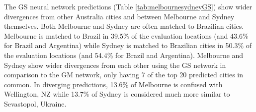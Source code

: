 \documentclass[10pt,letterpaper,hidelinks]{article}
\begin{document}
\begin{table}[!htbp]
\begin{adjustwidth}{-2.25in}{0in}
\begin{tabular}{ l l l l l}
\hline
\end{tabular}
\end{adjustwidth}
\end{table}

The GS neural network predictions (Table \ref{tab:melbournesydneyGS}) show wider divergences from other Australia cities and between Melbourne and Sydney themselves. Both Melbourne and Sydney are often matched to Brazilian cities. Melbourne is matched to Brazil in 39.5\% of the evaluation locations (and 43.6\% for Brazil and Argentina) while Sydney is matched to Brazilian cities in 50.3\% of the evaluation locations (and 54.4\% for Brazil and Argentina). Melbourne and Sydney show wider divergences from each other using the GS network in comparison to the GM network, only having 7 of the top 20 predicted cities in common. In diverging predictions, 13.6\% of Melbourne is confused with Wellington, NZ while 13.7\% of Sydney is considered much more similar to Sevastopol, Ukraine. 
\end{document}
